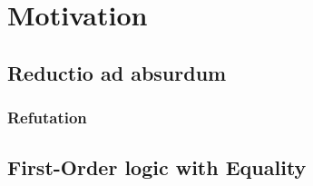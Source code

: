 
\section{Motivation}

\subsection{Reductio ad absurdum}

\begin{frame}
	\frametitle{Refutation}
	
	
\end{frame}

\subsection{First-Order logic with Equality}

\begin{frame}
	
\end{frame}



\begin{frame}
	
\end{frame}

\begin{frame}
	
	\pause
	
\end{frame}

\begin{frame}
	
\end{frame}
	

